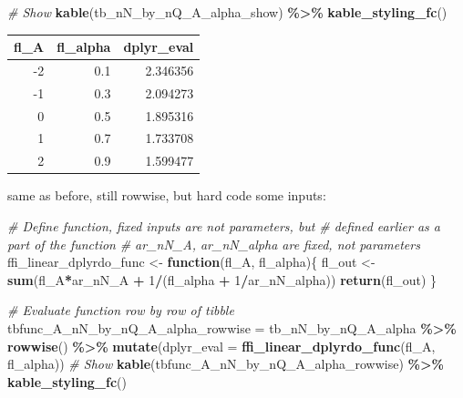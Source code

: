 \documentclass[
]{book}
\newenvironment{Shaded}{\begin{snugshade}}{\end{snugshade}}
\newcommand{\CommentTok}[1]{\textcolor[rgb]{0.56,0.35,0.01}{\textit{#1}}}
\newcommand{\ControlFlowTok}[1]{\textcolor[rgb]{0.13,0.29,0.53}{\textbf{#1}}}
\newcommand{\DataTypeTok}[1]{\textcolor[rgb]{0.13,0.29,0.53}{#1}}
\newcommand{\DecValTok}[1]{\textcolor[rgb]{0.00,0.00,0.81}{#1}}
\newcommand{\KeywordTok}[1]{\textcolor[rgb]{0.13,0.29,0.53}{\textbf{#1}}}
\newcommand{\NormalTok}[1]{#1}
\newcommand{\OperatorTok}[1]{\textcolor[rgb]{0.81,0.36,0.00}{\textbf{#1}}}
\newcommand{\StringTok}[1]{\textcolor[rgb]{0.31,0.60,0.02}{#1}}
\begin{document}
\begin{Shaded}
\begin{Highlighting}[]
\CommentTok{\# Show}
\KeywordTok{kable}\NormalTok{(tb\_nN\_by\_nQ\_A\_alpha\_show) }\OperatorTok{\%\textgreater{}\%}
\StringTok{  }\KeywordTok{kable\_styling\_fc}\NormalTok{()}
\end{Highlighting}
\end{Shaded}

\begin{table}[!h]
\centering
\begin{tabular}{r|r|r}
\hline
fl\_A & fl\_alpha & dplyr\_eval\\
\hline
\rowcolor{gray!6}  -2 & 0.1 & 2.346356\\
\hline
-1 & 0.3 & 2.094273\\
\hline
\rowcolor{gray!6}  0 & 0.5 & 1.895316\\
\hline
1 & 0.7 & 1.733708\\
\hline
\rowcolor{gray!6}  2 & 0.9 & 1.599477\\
\hline
\end{tabular}
\end{table}

same as before, still rowwise, but hard code some inputs:

\begin{Shaded}
\begin{Highlighting}[]
\CommentTok{\# Define function, fixed inputs are not parameters, but}
\CommentTok{\# defined earlier as a part of the function}
\CommentTok{\# ar\_nN\_A, ar\_nN\_alpha are fixed, not parameters}
\NormalTok{ffi\_linear\_dplyrdo\_func \textless{}{-}}\StringTok{ }\ControlFlowTok{function}\NormalTok{(fl\_A, fl\_alpha)\{}
\NormalTok{  fl\_out \textless{}{-}}\StringTok{ }\KeywordTok{sum}\NormalTok{(fl\_A}\OperatorTok{*}\NormalTok{ar\_nN\_A }\OperatorTok{+}\StringTok{ }\DecValTok{1}\OperatorTok{/}\NormalTok{(fl\_alpha }\OperatorTok{+}\StringTok{ }\DecValTok{1}\OperatorTok{/}\NormalTok{ar\_nN\_alpha))}
  \KeywordTok{return}\NormalTok{(fl\_out)}
\NormalTok{\}}

\CommentTok{\# Evaluate function row by row of tibble}
\NormalTok{tbfunc\_A\_nN\_by\_nQ\_A\_alpha\_rowwise =}\StringTok{ }\NormalTok{tb\_nN\_by\_nQ\_A\_alpha }\OperatorTok{\%\textgreater{}\%}\StringTok{ }\KeywordTok{rowwise}\NormalTok{() }\OperatorTok{\%\textgreater{}\%}
\StringTok{  }\KeywordTok{mutate}\NormalTok{(}\DataTypeTok{dplyr\_eval =} \KeywordTok{ffi\_linear\_dplyrdo\_func}\NormalTok{(fl\_A, fl\_alpha))}
\CommentTok{\# Show}
\KeywordTok{kable}\NormalTok{(tbfunc\_A\_nN\_by\_nQ\_A\_alpha\_rowwise) }\OperatorTok{\%\textgreater{}\%}
\StringTok{  }\KeywordTok{kable\_styling\_fc}\NormalTok{()}
\end{Highlighting}
\end{Shaded}
\end{document}
